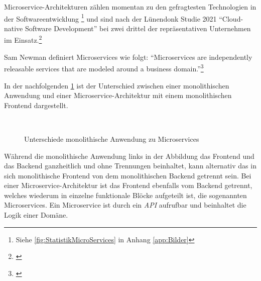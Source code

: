 Microservice-Architekturen zählen momentan zu den gefragtesten Technologien in der Softwareentwicklung \footnote{Siehe \cref{fig:StatistikMicroServices} in Anhang \ref{app:Bilder}} und sind nach der Lünendonk Studie 2021 \enquote{Cloud-native Software Development} bei zwei drittel der repräsentativen Unternehmen im Einsatz.\footnote{\cite[vgl.][]{Lünendonk2021}}

Sam Newman definiert Microservices wie folgt: \enquote{Microservices are independently releasable services that are modeled around a business domain.}\footnote{\cite[][18]{Newman2021}}

In der nachfolgenden \cref{fig:MicroservicesFeBe} ist der Unterschied zwischen einer monolithischen Anwendung und einer Microservice-Architektur mit einem monolithischen Frontend dargestellt.

\newpage
\begin{figure}[hbt!]
	\centering
	\begin{minipage}[t]{0.7\textwidth}	
		\caption{Unterschiede monolithische Anwendung zu Microservices}
		\\ %
		\label{fig:MicroservicesFeBe}
	\end{minipage}
\end{figure}

Während die monolithische Anwendung links in der Abbildung das Frontend und das Backend ganzheitlich und ohne Trennungen beinhaltet, kann alternativ das in sich monolithische Frontend von dem monolithischen Backend getrennt sein. Bei einer Microservice-Architektur ist das Frontend ebenfalls vom Backend getrennt, welches wiederum in einzelne funktionale Blöcke aufgeteilt ist, die sogenannten Microservices. Ein Microservice ist durch ein \textit{\gls{API}} aufrufbar und beinhaltet die Logik einer Domäne.


